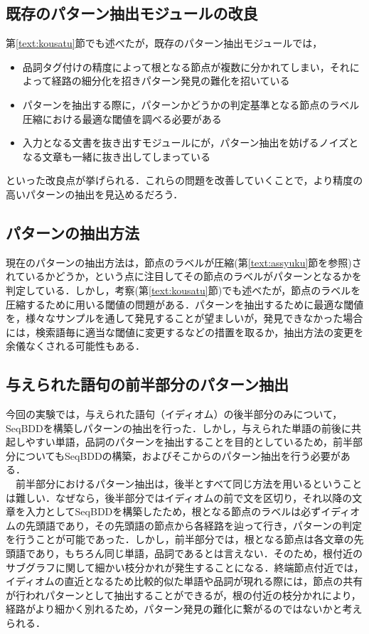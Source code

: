 \documentclass[12pt,twoside, fleqn]{ujbook}
\begin{document}
\subsection{既存のパターン抽出モジュールの改良}
第\ref{text:kousatu}節でも述べたが，既存のパターン抽出モジュールでは，
\begin{itemize}
	\item 品詞タグ付けの精度によって根となる節点が複数に分かれてしまい，それによって経路の細分化を招きパターン発見の難化を招いている
	\item パターンを抽出する際に，パターンかどうかの判定基準となる節点のラベル圧縮における最適な閾値を調べる必要がある
	\item 入力となる文書を抜き出すモジュールにが，パターン抽出を妨げるノイズとなる文章も一緒に抜き出してしまっている
\end{itemize}
といった改良点が挙げられる．これらの問題を改善していくことで，より精度の高いパターンの抽出を見込めるだろう．

\subsection{パターンの抽出方法}
現在のパターンの抽出方法は，節点のラベルが圧縮(第\ref{text:assyuku}節を参照)されているかどうか，という点に注目してその節点のラベルがパターンとなるかを判定している．しかし，考察(第\ref{text:kousatu}節)でも述べたが，節点のラベルを圧縮するために用いる閾値の問題がある．パターンを抽出するために最適な閾値を，様々なサンプルを通して発見することが望ましいが，発見できなかった場合には，検索語毎に適当な閾値に変更するなどの措置を取るか，抽出方法の変更を余儀なくされる可能性もある．


\subsection{与えられた語句の前半部分のパターン抽出}
今回の実験では，与えられた語句（イディオム）の後半部分のみについて，SeqBDDを構築しパターンの抽出を行った．しかし，与えられた単語の前後に共起しやすい単語，品詞のパターンを抽出することを目的としているため，前半部分についてもSeqBDDの構築，およびそこからのパターン抽出を行う必要がある．\\
\ \ 前半部分におけるパターン抽出は，後半とすべて同じ方法を用いるということは難しい．なぜなら，後半部分ではイディオムの前で文を区切り，それ以降の文章を入力としてSeqBDDを構築したため，根となる節点のラベルは必ずイディオムの先頭語であり，その先頭語の節点から各経路を辿って行き，パターンの判定を行うことが可能であった．しかし，前半部分では，根となる節点は各文章の先頭語であり，もちろん同じ単語，品詞であるとは言えない．そのため，根付近のサブグラフに関して細かい枝分かれが発生することになる．終端節点付近では，イディオムの直近となるため比較的似た単語や品詞が現れる際には，節点の共有が行われパターンとして抽出することができるが，根の付近の枝分かれにより，経路がより細かく別れるため，パターン発見の難化に繋がるのではないかと考えられる．
\end{document}
